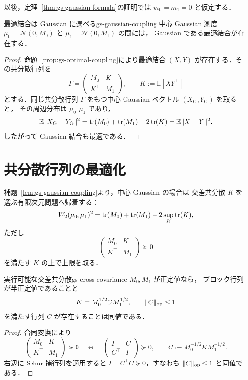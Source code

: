 以後，定理~\ref{thm:gs-gaussian-formula}の証明では
$m_0=m_1=0$ と仮定する．

\begin{lemma}{最適結合は Gaussian に選べる}{gs-gaussian-coupling}
  中心 Gaussian 測度
  $\mu_0=\mathcal{N}(0,M_0)$ と
  $\mu_1=\mathcal{N}(0,M_1)$ の間には，
  Gaussian である最適結合が存在する．
\end{lemma}

\begin{proof}
  命題~\ref{prop:gs-optimal-coupling}により最適結合
  $(X,Y)$ が存在する．その共分散行列を
  \[
    \Gamma
    =
    \begin{pmatrix}
      M_0 & K\\
      K^\top & M_1
    \end{pmatrix},
    \qquad
    K:=\mathbb{E}[XY^\top]
  \]
  とする．同じ共分散行列 $\Gamma$ をもつ中心 Gaussian ベクトル
  $(X_{\mathrm{G}},Y_{\mathrm{G}})$ を取ると，
  その周辺分布は $\mu_0,\mu_1$ であり，
  \[
    \mathbb{E}\lVert X_{\mathrm{G}}-Y_{\mathrm{G}} \rVert^2
    =
    \operatorname{tr}(M_0)+\operatorname{tr}(M_1)-2\operatorname{tr}(K)
    =
    \mathbb{E}\lVert X-Y \rVert^2.
  \]
  したがって Gaussian 結合も最適である．
\end{proof}

\section{共分散行列の最適化}
\label{sec:covariance-optimization}

補題~\ref{lem:gs-gaussian-coupling}より，中心 Gaussian の場合は
交差共分散 $K$ を選ぶ有限次元問題へ帰着する：
\[
  W_2(\mu_0,\mu_1)^2
  =
  \operatorname{tr}(M_0)+\operatorname{tr}(M_1)
  -2\sup_K\operatorname{tr}(K),
\]
ただし
\[
  \begin{pmatrix}
    M_0 & K\\
    K^\top & M_1
  \end{pmatrix}
  \succeq0
\]
を満たす $K$ の上で上限を取る．

\begin{lemma}{実行可能な交差共分散}{gs-cross-covariance}
  $M_0,M_1$ が正定値なら，
  ブロック行列が半正定値であることと
  \[
    K=M_0^{1/2}CM_1^{1/2},
    \qquad
    \lVert C \rVert_{\mathrm{op}}\leq1
  \]
  を満たす行列 $C$ が存在することは同値である．
\end{lemma}

\begin{proof}
  合同変換により
  \[
    \begin{pmatrix}
      M_0 & K\\
      K^\top & M_1
    \end{pmatrix}
    \succeq0
    \quad\Longleftrightarrow\quad
    \begin{pmatrix}
      I & C\\
      C^\top & I
    \end{pmatrix}
    \succeq0,
    \qquad
    C:=M_0^{-1/2}KM_1^{-1/2}.
  \]
  右辺に Schur 補行列を適用すると
  $I-C^\top C\succeq0$，すなわち
  $\lVert C \rVert_{\mathrm{op}}\leq1$ と同値である．
\end{proof}


